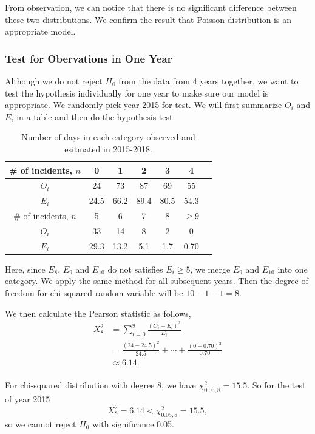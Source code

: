 \documentclass[11pt,a4paper,english]{article}
\begin{document}
From observation, we can notice that there is no significant difference between these two distributions. We confirm the result that Poisson distribution is an appropriate model.
\subsubsection{Test for Obervations in One Year}
Although we do not reject $H_{0}$ from the data from 4 years together, we want to test the hypothesis individually for one year to make sure our model is appropriate. We randomly pick year 2015 for test. We will first summarize $O_{i}$ and $E_{i}$ in a table and then do the hypothesis test.


\begin{table}[htbp]
    \centering
    \caption{Number of days in each category observed and esitmated in 2015-2018.}
	\begin{tabular}{c|cccccc}
		\hline
        \# of incidents, $n$ & 0 & 1 & 2 & 3 & 4  \\
		\hline
		$O_{i}$ & 24 & 73 & 87 & 69 & 55 \\
		\hline
		$E_{i}$ & 24.5 & 66.2 & 89.4 & 80.5 & 54.3 \\ 
		\hline
		\hline
		\# of incidents, $n$ & 5 & 6 & 7 & 8 & $\geq 9$  \\
		\hline
		$O_{i}$ & 33 & 14 & 8 & 2 & 0\\
		\hline
		$E_{i}$ & 29.3 & 13.2 & 5.1 & 1.7 & 0.70\\ 
		\hline 
    \end{tabular}
\end{table}

Here, since $E_{8}$, $E_{9}$ and $E_{10}$ do not satisfies $E_{i} \geq 5$, we merge $E_{9}$ and $E_{10}$ into one category. 
We apply the same method for all subsequent years. Then the degree of freedom for chi-squared random variable will be $10-1-1 = 8$.

We then calculate the Pearson statistic as follows,
\[
	\begin{aligned}
		X_{8}^{2} &= \sum_{i = 0}^{9}\frac{(O_{i}-E_{i})^{2}}{E_{i}}\\
		&= \frac{(24-24.5)^{2}}{24.5}+\cdots+\frac{(0-0.70)^{2}}{0.70}\\
		&\approx 6.14.\\
	\end{aligned}
\] 

For chi-squared distribution with degree 8, we have $\chi_{0.05,8}^{2} = 15.5$. So for the test of year 2015
\[X_{8}^{2} = 6.14 < \chi_{0.05,8}^{2} = 15.5,\]
so we cannot reject $H_{0}$ with significance 0.05.
\end{document}
